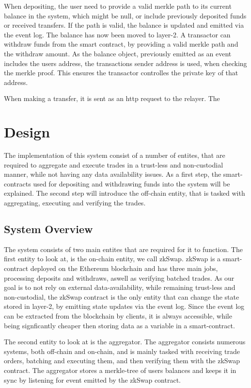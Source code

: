 \documentclass[11pt,twoside,a4paper,final]{book}
\begin{document}
When depositing, the user need to provide a valid merkle path to its current balance in the system, which might be null, or include previously deposited funds or received transfers. If the path is valid, the balance is updated and emitted via the event log. The balance has now been moved to layer-2. A transactor can withdraw funds from the smart contract, by providing a valid merkle path and the withdraw amount. As the balance object, previously emitted as an event includes the users address, the transactions sender address is used, when checking the merkle proof. This ensures the transactor controlles the private key of that address.


When making a transfer, it is sent as an http request to the relayer. The 


\section{Design}
The implementation of this system consist of a number of entites, that are required to aggregate and execute trades in a trust-less and non-custodial manner, while not having any data availability issues. As a first step, the smart-contracts used for depositing and withdrawing funds into the system will be explained. The second step will introduce the off-chain entity, that is tasked with aggregating, executing and verifying the trades.

\subsection{System Overview}
The system consists of two main entites that are required for it to function. The first entity to look at, is the on-chain entity, we call zkSwap. zkSwap is a smart-contract deployed on the Ethereum blockchain and has three main jobs, processing deposits and withdraws, aswell as verifying batched trades. As our goal is to not rely on external data-availability, while remaining trust-less and non-custodial, the zkSwap contract is the only entity that can change the state stored in layer-2, by emitting state updates via the event log. Since the event log can be extracted from the blockchain by clients, it is always accessible, while being signficantly cheaper then storing data as a variable in a smart-contract.

The second entity to look at is the aggregator. The aggregator consists numerous systems, both off-chain and on-chain, and is mainly tasked with receiving trade orders, batching and executing them, and then verifying them with the zkSwap contract. The aggregator stores a merkle-tree of users balances and keeps it in sync by listening for event emitted by the zkSwap contract. 
\end{document}
